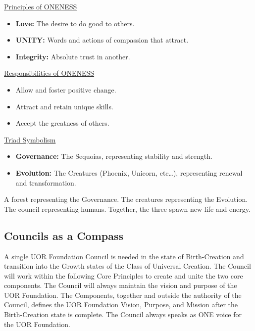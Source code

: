 \documentclass[twocolumn,10pt]{article}
\begin{document}
\vspace{20pt}
\begin{minipage}{0.95\linewidth}
    \begin{tcolorbox}
        \begin{center}\underline{Principles of ONENESS}\end{center}
        \begin{itemize}
            \item \textbf{Love:} The desire to do good to others.
            \item \textbf{UNITY:} Words and actions of compassion that attract.
            \item \textbf{Integrity:} Absolute trust in another.
        \end{itemize}

        \begin{center}\underline{Responsibilities of ONENESS}\end{center}
        \begin{itemize}
            \item Allow and foster positive change.
            \item Attract and retain unique skills.
            \item Accept the greatness of others.
        \end{itemize}

        \begin{center}\underline{Triad Symbolism}\end{center}
        \begin{itemize}
            \item \textbf{Governance:} The Sequoias, representing stability and strength.
            \item \textbf{Evolution:} The Creatures (Phoenix, Unicorn, etc\ldots), representing renewal and transformation.
        \end{itemize}
    \end{tcolorbox}
\end{minipage}
\vspace{10pt}

A forest representing the Governance.
The creatures representing the Evolution.
The council representing humans.
Together, the three spawn new life and energy.

\subsection*{Councils as a Compass}
A single UOR Foundation Council is needed in the state of Birth-Creation and transition into the Growth states of the Class of Universal Creation.
The Council will work within the following Core Principles to create and unite the two core components.
The Council will always maintain the vision and purpose of the UOR Foundation.
The Components, together and outside the authority of the Council, defines the UOR Foundation Vision, Purpose, and Mission after the Birth-Creation state is complete.
The Council always speaks as ONE voice for the UOR Foundation.
\end{document}

